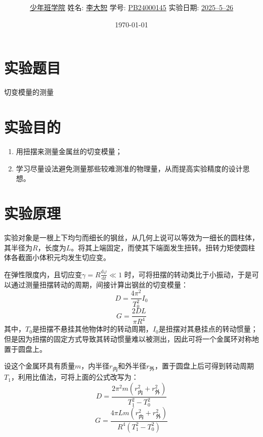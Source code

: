 \documentclass[12pt,a4paper]{article}
\title{\Huge{\textbf{\uuline{实\ 验\ 报\ 告}}}}
\author{\uline{少年班学院} \quad 姓名: \uline{李大恕} \quad 学号: \uline{PB24000145} \quad 实验日期: \uline{2025--5--26}}
\date{\today}
\begin{document}
\maketitle

\section{实验题目}
	切变模量的测量

\section{实验目的}
    \begin{enumerate}
        \item 用扭摆来测量金属丝的切变模量；
        \item 学习尽量设法避免测量那些较难测准的物理量，从而提高实验精度的设计思想。
    \end{enumerate}

\section{实验原理}
    实验对象是一根上下均匀而细长的钢丝，从几何上说可以等效为一细长的圆柱体，其半径为$R$，长度为$L$。将其上端固定，而使其下端面发生扭转。扭转力矩使圆柱体各截面小体积元均发生切应变。

    在弹性限度内，且切应变$\gamma=R\frac{\mathrm d\varphi}{\mathrm dt}\ll 1$ 时，可将扭摆的转动类比于小振动，于是可以通过测量扭摆转动的周期，间接计算出钢丝的切变模量：
    \begin{equation}
        D = \frac{4\pi^2}{T_0^2}I_0
    \end{equation}
    \begin{equation}
        G = \frac{2DL}{\pi R^4}
    \end{equation}
    其中，$T_0$是扭摆不悬挂其他物体时的转动周期，$I_0$是扭摆对其悬挂点的转动惯量；但是因为扭摆的固定方式导致其转动惯量难以被测出，因此可将一个金属环对称地置于圆盘上。

    设这个金属环具有质量$m$，内半径$r_\text{内}$和外半径$r_\text{外}$，置于圆盘上后可得到转动周期$T_1$，利用比值法，可将上面的公式改写为：
    \begin{equation}
        D = \frac{2\pi^2 m (r_\text{内}^2 + r_\text{外}^2)}{T_1^2 - T_0^2}
    \end{equation}
    \begin{equation}
        G = \frac{4\pi L m (r_\text{内}^2 + r_\text{外}^2)}{R^4 (T_1^2 - T_0^2)}
    \end{equation}
\end{document}
